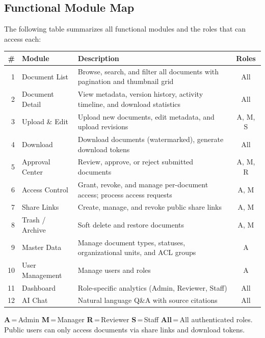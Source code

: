 \subsection{Functional Module Map}

The following table summarizes all functional modules and the
roles that can access each:

\begin{tabularx}{\textwidth}{@{} r l X c @{}}
  \toprule
  \textbf{\#} & \textbf{Module} & \textbf{Description}
    & \textbf{Roles} \\
  \midrule
  1 & Document List
    & Browse, search, and filter all documents with
      pagination and thumbnail grid
    & All \\
  2 & Document Detail
    & View metadata, version history, activity timeline,
      and download statistics
    & All \\
  3 & Upload \& Edit
    & Upload new documents, edit metadata, and upload
      revisions
    & A, M, S \\
  4 & Download
    & Download documents (watermarked), generate
      download tokens
    & All \\
  5 & Approval Center
    & Review, approve, or reject submitted documents
    & A, M, R \\
  6 & Access Control
    & Grant, revoke, and manage per-document access;
      process access requests
    & A, M \\
  7 & Share Links
    & Create, manage, and revoke public share links
    & A, M \\
  8 & Trash / Archive
    & Soft delete and restore documents
    & A, M \\
  9 & Master Data
    & Manage document types, statuses, organizational
      units, and ACL groups
    & A \\
  10 & User Management
    & Manage users and roles
    & A \\
  11 & Dashboard
    & Role-specific analytics (Admin, Reviewer, Staff)
    & All \\
  12 & AI Chat
    & Natural language Q\&A with source citations
    & All \\
  \bottomrule
\end{tabularx}

\begin{ugNote}[Legend]
  \textbf{A}\,=\,Admin\quad
  \textbf{M}\,=\,Manager\quad
  \textbf{R}\,=\,Reviewer\quad
  \textbf{S}\,=\,Staff\quad
  \textbf{All}\,=\,All authenticated roles.
  Public users can only access documents via share links
  and download tokens.
\end{ugNote}

